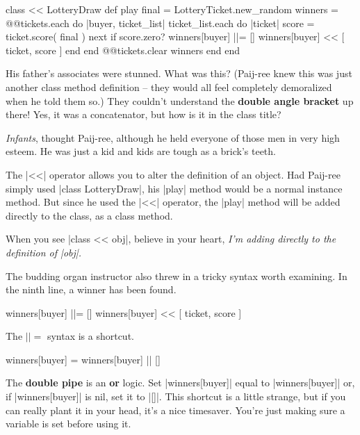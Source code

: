 \documentclass[12pt,twoside]{report}
\begin{document}
\begin{rubycode}

 class << LotteryDraw
   def play
     final = LotteryTicket.new_random
     winners = {}
     @@tickets.each do |buyer, ticket_list|
       ticket_list.each do |ticket|
         score = ticket.score( final )
         next if score.zero?
         winners[buyer] ||= []
         winners[buyer] << [ ticket, score ]
       end
     end
     @@tickets.clear
     winners
   end
 end

\end{rubycode}


His father's associates were stunned.  What was this?  (Paij-ree knew
this was just another class method definition -- they would all feel
completely demoralized when he told them so.)  They couldn't
understand the {\bf double angle bracket} up there!  Yes, it was a
concatenator, but how is it in the class title?

{\em Infants}, thought Paij-ree, although he held everyone of those
men in very high esteem.  He was just a kid and kids are tough as a
brick's teeth.

The \rubyinline|<<| operator allows you to alter the
definition of an object. Had Paij-ree simply used
\rubyinline|class LotteryDraw|, his
\rubyinline|play| method would be a normal instance
method.  But since he used the \rubyinline|<<|
operator, the \rubyinline|play| method will be added
directly to the class, as a class method.

When you see \rubyinline|class << obj|, believe in
your heart, {\em I'm adding directly to the definition of
  \rubyinline|obj|.}

The budding organ instructor also threw in a tricky syntax worth
examining. In the ninth line, a winner has been found.


\begin{rubycode}

 winners[buyer] ||= []
 winners[buyer] << [ ticket, score ]

\end{rubycode}


The \rubyinline$||=$ syntax is a shortcut.


\begin{rubycode}

 winners[buyer] = winners[buyer] || []

\end{rubycode}


The {\bf double pipe} is an {\bf or} logic.  Set
\rubyinline|winners[buyer]| equal to
\rubyinline|winners[buyer]| or, if
\rubyinline|winners[buyer]| is nil, set it to
\rubyinline|[]|.  This shortcut is a little strange,
but if you can really plant it in your head, it's a nice timesaver.
You're just making sure a variable is set before using it.
\end{document}
